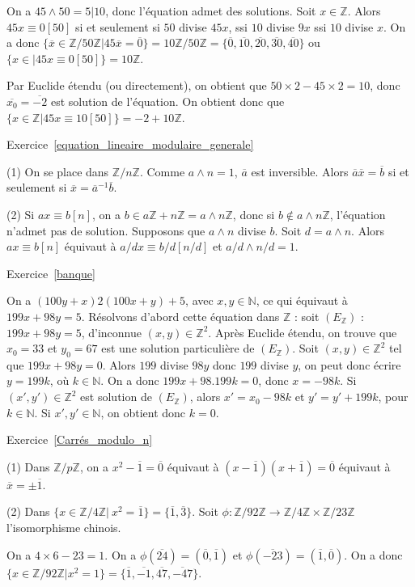 \documentclass[11pt,a4paper]{article}
\newcommand{\N}{\mathbb{N}}
\newcommand{\Z}{\mathbb{Z}}
\begin{document}
On a $45\wedge 50=5|10$, donc l'équation admet des solutions. Soit $x\in \Z$. Alors $45x\equiv 0[50]$ si et seulement si $50$ divise $45 x$, ssi $10$ divise $9x$ ssi $10$ divise $x$. On a donc $\{\overline{x}\in \Z/50\Z|45 \overline{x}=\overline{0}\}=10 \Z/50\Z=\{\overline{0},\overline{10}, \overline{20}, \overline{30}, \overline{40}\}$ ou $\{x\in |45x\equiv 0[50]\}=10\Z$. 

Par Euclide étendu (ou directement), on obtient que $50\times 2-45\times 2 =10$, donc $\overline{x_0}=\overline{-2}$ est solution de l'équation. On obtient donc que $\{x\in \Z|45x\equiv 10[50]\}=-2+10\Z$. 


Exercice~\ref{equation_lineaire_modulaire_generale}


(1) On se place dans $\Z/n\Z$. Comme $a\wedge n=1$, $\overline{a}$ est inversible. Alors $\overline{a}\overline{x}=\overline{b}$ si et seulement si $\overline{x}=\overline{a}^{-1}\overline{b}$. 

(2) Si $ax\equiv b[n]$, on a $b\in a\Z+n\Z=a\wedge n \Z$, donc si $b\notin a\wedge n \Z$, l'équation n'admet pas de solution. Supposons que $a\wedge n $ divise $b$. Soit $d=a\wedge n$. Alors $ax\equiv b[n]$ équivaut à $a/d x\equiv b/d[n/d]$ et $a/d\wedge n/d=1$.

Exercice~\ref{banque}

On a $(100 y +x) 2(100x+y)+5$, avec $x,y\in \N$, ce qui équivaut à $199x +98 y=5$. Résolvons d'abord cette équation dans $\Z$ : soit $(E_\Z)$ : $199x +98 y=5$, d'inconnue $(x,y)\in \Z^2$. Après Euclide étendu, on trouve que $x_0=33$ et $y_0=67$ est une solution particulière de $(E_\Z)$.  Soit $(x,y)\in \Z^2$ tel que $199x+98y=0$. Alors $199$ divise $98y$ donc $199$ divise $y$, on peut donc écrire $y=199 k$, où $k\in \N$. On a donc $199 x +98.199 k=0$, donc $x=-98k$. Si $(x',y')\in \Z^2$ est solution de $(E_\Z)$, alors $x'=x_0-98k$ et $y'=y'+199k$, pour $k\in \N$. Si $x',y'\in\N$, on obtient donc $k=0$. 

Exercice~\ref{Carrés_modulo_n}

(1) Dans $\Z/p\Z$, on a $x^2-\overline{1}=\overline{0}$ équivaut à $(x-\overline{1})(x+\overline{1})=\overline{0}$ équivaut à $\overline{x}=\pm \overline{1}$. 

(2) Dans $\{x\in \Z/4\Z|\ x^2=\overline{1}\}=\{\overline{1},\overline{3}\}$. Soit $\phi:\Z/92\Z\rightarrow \Z/4\Z\times \Z/23\Z$ l'isomorphisme chinois. 

On a $4\times 6-23=1$. On a $\phi(\overline{24})=(\overline{0},\overline{1})$ et $\phi(\overline{-23})=(\overline{1},\overline{0})$. On a donc $\{x\in \Z/92\Z|x^2=1\}=\{\overline{1},\overline{-1},\overline{47},\overline{-47}\}$. 
\end{document}
